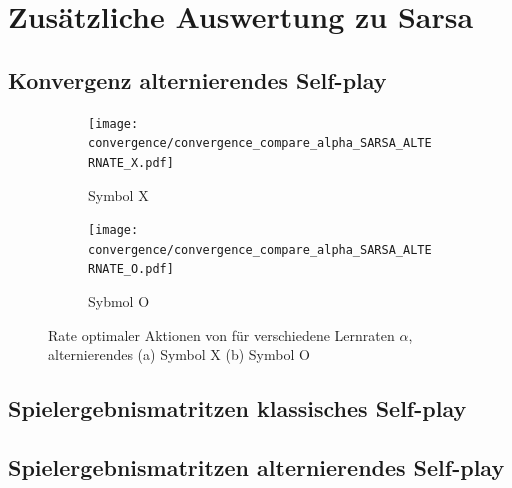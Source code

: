 




\chapter{Zusätzliche Auswertung zu Sarsa}
\label{chap:app_sarsa}
\section{Konvergenz alternierendes Self-play}

\begin{figure}[h]
\centering
\begin{subfigure}[b]{0.75\textwidth}
    \centering
   \texttt{[image: convergence/convergence\_compare\_alpha\_SARSA\_ALTERNATE\_X.pdf]}
   \caption{Symbol X}
   \label{fig:convergence_compare_alpha_SARSA_ALTERNATE_X} 
\end{subfigure}

\begin{subfigure}[b]{0.75\textwidth}
    \centering
   \texttt{[image: convergence/convergence\_compare\_alpha\_SARSA\_ALTERNATE\_O.pdf]}
   \caption{Sybmol O}
   \label{fig:convergence_compare_alpha_SARSA_ALTERNATE_O}
\end{subfigure}

\caption[Rate optimaler Aktionen \sarsa unterschiedliche Lernraten, alternierendes \splay]{Rate optimaler Aktionen von \sarsa für verschiedene Lernraten $\alpha$, alternierendes \splay (a) Symbol X (b) Symbol O}
\label{fig:convergence_compare_alpha_SARSA_ALTERNATE}
\end{figure}

\section{Spielergebnismatritzen klassisches Self-play}



\section{Spielergebnismatritzen alternierendes Self-play}



